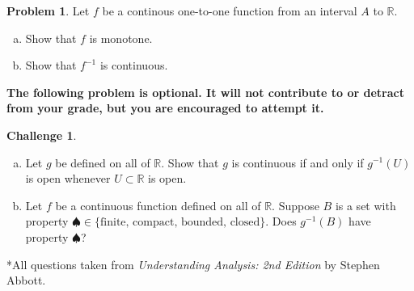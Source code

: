 \documentclass{amsart}
\newcommand{\+}[1]{\ensuremath{\mathbf{#1}}}
\newcommand{\R}{{\mathbb R}}
\theoremstyle{definition}
\newtheorem{prob}{Problem}
\newtheorem{chal}{Challenge}
\begin{document}
 
\begin{prob}
Let $f$ be a continous one-to-one function
from an interval $A$ to $\R$.
\begin{enumerate}[(a)]
\item Show that $f$ is monotone.
\item Show that $f^{-1}$ is continuous.
\end{enumerate}
\end{prob}






\vspace{5mm}

{\bf The following problem is optional.  It
will not contribute to or detract from your grade, but you are encouraged
to attempt it.}

\vspace{5mm}

\begin{chal}
\begin{enumerate}[(a)]
\item Let $g$ be defined on all of $\R$.
Show that $g$ is continuous if and only if 
$g^{-1}(U)$ is open whenever $U \subset \R$ is open.
\item Let $f$ be a continuous function defined on all of $\R$.
Suppose $B$ is a set with property $\spadesuit \in \{\text{finite, compact, bounded, closed}\}$.
Does $g^{-1}(B)$ have property $\spadesuit$?
\end{enumerate}
\end{chal}


\vspace{5mm}

*All questions taken from \emph{Understanding Analysis: 2nd Edition} by Stephen Abbott.
\end{document}
